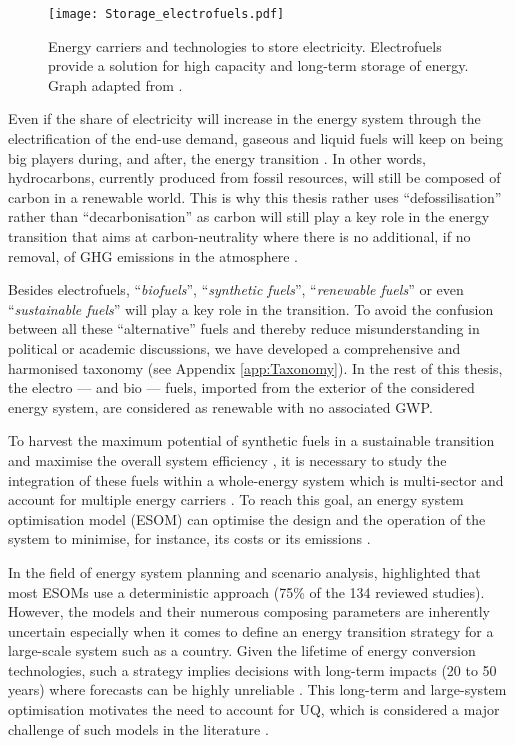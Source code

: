 \begin{figure}[htbp!]
\centering
\texttt{[image: Storage\_electrofuels.pdf]}
\caption{Energy carriers and technologies to store electricity. Electrofuels provide a solution for high capacity and long-term storage of energy. Graph adapted from \cite{ISPT2017}.}
\label{fig:intro:Storage_electrofuels}
\end{figure}

\newpage
Even if the share of electricity will increase in the energy system through the electrification of the end-use demand, gaseous and liquid fuels will keep on being big players during, and after, the energy transition \cite{Ahlgren2012}. In other words, hydrocarbons, currently produced from fossil resources, will still be composed of carbon in a renewable world. This is why this thesis rather uses ``defossilisation'' rather than ``decarbonisation'' as carbon will still play a key role in the energy transition that aims at carbon-neutrality where there is no additional, if no removal, of \gls{GHG} emissions in the atmosphere \cite{mertens2020carbon}. 

Besides electrofuels, ``\emph{biofuels}'', ``\emph{synthetic fuels}'', ``\emph{renewable fuels}'' or even ``\emph{sustainable fuels}'' will play a key role in the transition. To avoid the confusion between all these ``alternative'' fuels and thereby reduce misunderstanding in political or academic discussions, we have developed a comprehensive and harmonised taxonomy (see Appendix \ref{app:Taxonomy}).  In the rest of this thesis, the electro --- and bio --- fuels, imported from the exterior of the considered energy system, are considered as renewable with no associated \gls{GWP}. 

To harvest the maximum potential of synthetic fuels in a sustainable transition and maximise the overall system efficiency \cite{mathiesen2015}, it is necessary to study the integration of these fuels within a whole-energy system which is multi-sector and account for multiple energy carriers \cite{contino2020whole}. To reach this goal, an energy system optimisation model (ESOM) can optimise the design and the operation of the system to minimise, for instance, its costs or its emissions \cite{zeng2011review}. 

In the field of energy system planning and scenario analysis, \citet{yue2018review} highlighted that most ESOMs use a deterministic approach (75\% of the 134 reviewed studies). However, the models and their numerous composing parameters are inherently uncertain especially when it comes to define an energy transition strategy for a large-scale system such as a country. Given the lifetime of energy conversion technologies, such a strategy implies decisions with long-term impacts (20 to 50 years) where forecasts can be highly unreliable \cite{Moret2017}. This long-term and large-system optimisation motivates the need to account for \gls{UQ}, which is considered a major challenge of such models in the literature \cite{pfenninger2014energy}. %

